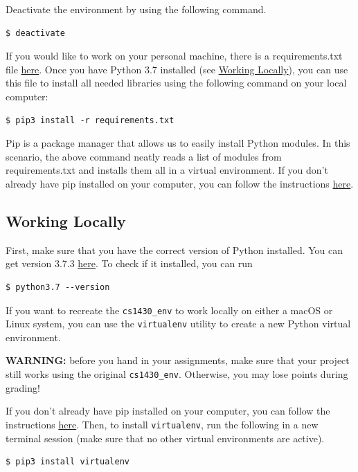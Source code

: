 \documentclass{article}
\begin{document}
Deactivate the environment by using the following command.
\begin{verbatim}
$ deactivate
\end{verbatim}

If you would like to work on your personal machine, there is a requirements.txt file \href{http://cs.brown.edu/courses/csci1430/gradescope/requirements.txt}{here}.
Once you have Python 3.7 installed (see \hyperref[sec:local]{Working Locally}), you can use this file to install all needed libraries using the following command on your local computer:
\begin{verbatim}
$ pip3 install -r requirements.txt
\end{verbatim}

Pip is a package manager that allows us to easily install Python modules. In this scenario, the above command neatly reads a list of modules from requirements.txt and installs them all in a virtual environment. If you don't already have pip installed on your computer, you can follow the instructions \href{https://pip.pypa.io/en/stable/installing/}{here}.

\subsection{Working Locally}
\label{sec:local}
First, make sure that you have the correct version of Python installed. You can get version 3.7.3 \href{https://www.python.org/downloads/release/python-373/}{here}. To check if it installed, you can run
\begin{verbatim}
$ python3.7 --version
\end{verbatim}

If you want to recreate the \texttt{cs1430\_env} to work locally on either a macOS or Linux system, you can use the \texttt{virtualenv} utility to create a new Python virtual environment.

\textbf{WARNING:} before you hand in your assignments, make sure that your project still works using the original \texttt{cs1430\_env}. Otherwise, you may lose points during grading!

If you don't already have pip installed on your computer, you can follow the instructions \href{https://pip.pypa.io/en/stable/installing/}{here}. Then, to install \texttt{virtualenv}, run the following in a new terminal session (make sure that no other virtual environments are active).
\begin{verbatim}
$ pip3 install virtualenv
\end{verbatim}
\end{document}
